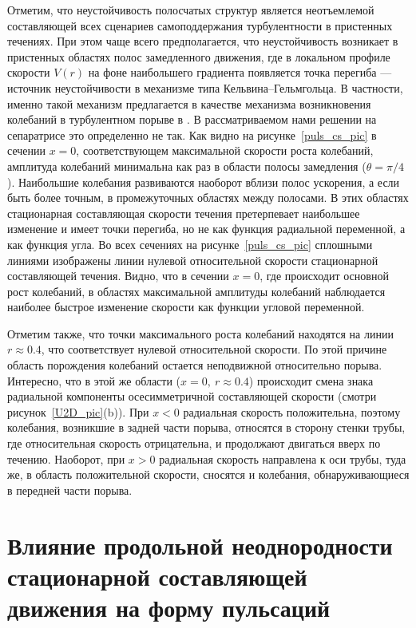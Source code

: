 Отметим, что неустойчивость полосчатых структур является неотъемлемой составляющей всех сценариев самоподдержания турбулентности в пристенных течениях. При этом чаще всего предполагается, что неустойчивость возникает в пристенных областях полос замедленного движения, где в локальном профиле скорости $V(r)$ на фоне наибольшего градиента появляется точка перегиба --- источник неустойчивости в механизме типа Кельвина--Гельмгольца. В частности, именно такой механизм предлагается в качестве механизма возникновения колебаний в турбулентном порыве в \cite{Shimizu2009}. В рассматриваемом нами решении на сепаратрисе это определенно не так. Как видно на рисунке~\ref{puls_cs_pic} в сечении $x=0$, соответствующем максимальной скорости роста колебаний, амплитуда колебаний минимальна как раз в области полосы замедления ($\theta=\pi/4$). Наибольшие колебания развиваются наоборот вблизи полос ускорения, а если быть более точным, в промежуточных областях между полосами. В этих областях стационарная составляющая скорости течения претерпевает наибольшее изменение и имеет точки перегиба, но не как функция радиальной переменной, а как функция угла. Во всех сечениях на рисунке~\ref{puls_cs_pic} сплошными линиями изображены линии нулевой относительной скорости стационарной составляющей течения. Видно, что в сечении $x=0$, где происходит основной рост колебаний, в областях максимальной амплитуды колебаний наблюдается наиболее быстрое изменение скорости как функции угловой переменной.

Отметим также, что точки максимального роста колебаний находятся на линии $r\approx0.4$, что соответствует нулевой относительной скорости. По этой причине область порождения колебаний остается неподвижной относительно порыва. Интересно, что в этой же области ($x=0,\ r\approx0.4$) происходит смена знака радиальной компоненты осесимметричной составляющей скорости (смотри рисунок~\ref{U2D_pic}(b)). При $x<0$ радиальная скорость положительна, поэтому колебания, возникшие в задней части порыва, относятся в сторону стенки трубы, где относительная скорость отрицательна, и продолжают двигаться вверх по течению. Наоборот, при $x>0$ радиальная скорость направлена к оси трубы, туда же, в область положительной скорости, сносятся и колебания, обнаруживающиеся в передней части порыва.


\section{Влияние продольной неоднородности стационарной составляющей движения на форму пульсаций}

